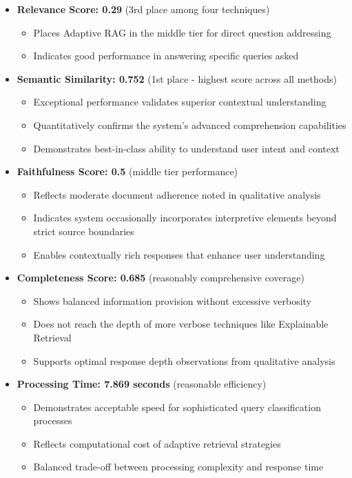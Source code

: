 \documentclass[12pt,a4paper]{article}
\begin{document}
\begin{itemize}
    \item \textbf{Relevance Score: 0.29} (3rd place among four techniques)
    \begin{itemize}
        \item Places Adaptive RAG in the middle tier for direct question addressing
        \item Indicates good performance in answering specific queries asked
    \end{itemize}
    
    \item \textbf{Semantic Similarity: 0.752} (1st place - highest score across all methods)
    \begin{itemize}
        \item Exceptional performance validates superior contextual understanding
        \item Quantitatively confirms the system's advanced comprehension capabilities
        \item Demonstrates best-in-class ability to understand user intent and context
    \end{itemize}
    
    \item \textbf{Faithfulness Score: 0.5} (middle tier performance)
    \begin{itemize}
        \item Reflects moderate document adherence noted in qualitative analysis
        \item Indicates system occasionally incorporates interpretive elements beyond strict source boundaries
        \item Enables contextually rich responses that enhance user understanding
    \end{itemize}
    
    \item \textbf{Completeness Score: 0.685} (reasonably comprehensive coverage)
    \begin{itemize}
        \item Shows balanced information provision without excessive verbosity
        \item Does not reach the depth of more verbose techniques like Explainable Retrieval
        \item Supports optimal response depth observations from qualitative analysis
    \end{itemize}
    
    \item \textbf{Processing Time: 7.869 seconds} (reasonable efficiency)
    \begin{itemize}
        \item Demonstrates acceptable speed for sophisticated query classification processes
        \item Reflects computational cost of adaptive retrieval strategies
        \item Balanced trade-off between processing complexity and response time
    \end{itemize}
    

\end{itemize}
\end{document}
